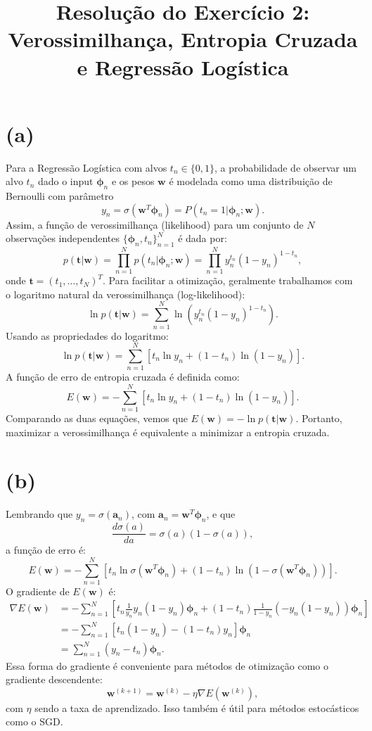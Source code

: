 \documentclass[12pt]{article}
\title{Resolução do Exercício 2: Verossimilhança, Entropia Cruzada e Regressão Logística}
\author{}
\date{}
\begin{document}
\maketitle

\section*{(a)}
Para a Regressão Logística com alvos $t_n \in \{0,1\}$, a probabilidade de observar um alvo $t_n$ dado o input $\boldsymbol{\phi}_n$ e os pesos $\mathbf{w}$ é modelada como uma distribuição de Bernoulli com parâmetro 
\[
y_n = \sigma(\mathbf{w}^T \boldsymbol{\phi}_n) = P(t_n = 1 | \boldsymbol{\phi}_n; \mathbf{w}).
\]
Assim, a função de verossimilhança (likelihood) para um conjunto de $N$ observações independentes $\{\boldsymbol{\phi}_n, t_n\}_{n=1}^{N}$ é dada por:
\[
p(\mathbf{t} | \mathbf{w}) = \prod_{n=1}^{N} p(t_n | \boldsymbol{\phi}_n; \mathbf{w}) = \prod_{n=1}^{N} y_n^{t_n} (1 - y_n)^{1 - t_n},
\]
onde $\mathbf{t} = (t_1, \ldots, t_N)^T$. Para facilitar a otimização, geralmente trabalhamos com o logaritmo natural da verossimilhança (log-likelihood):
\[
\ln p(\mathbf{t} | \mathbf{w}) = \sum_{n=1}^{N} \ln \left( y_n^{t_n} (1 - y_n)^{1 - t_n} \right).
\]
Usando as propriedades do logaritmo:
\[
\ln p(\mathbf{t} | \mathbf{w}) = \sum_{n=1}^{N} \left[ t_n \ln y_n + (1 - t_n) \ln(1 - y_n) \right].
\]
A função de erro de entropia cruzada é definida como:
\[
E(\mathbf{w}) = -\sum_{n=1}^{N} \left[ t_n \ln y_n + (1 - t_n) \ln(1 - y_n) \right].
\]
Comparando as duas equações, vemos que $E(\mathbf{w}) = -\ln p(\mathbf{t} | \mathbf{w})$. Portanto, maximizar a verossimilhança é equivalente a minimizar a entropia cruzada.

\section*{(b)}
Lembrando que $y_n = \sigma(\mathbf{a}_n)$, com $\mathbf{a}_n = \mathbf{w}^T \boldsymbol{\phi}_n$, e que
\[
\frac{d\sigma(a)}{da} = \sigma(a)(1 - \sigma(a)),
\]
a função de erro é:
\[
E(\mathbf{w}) = -\sum_{n=1}^{N} \left[ t_n \ln \sigma(\mathbf{w}^T \boldsymbol{\phi}_n) + (1 - t_n) \ln(1 - \sigma(\mathbf{w}^T \boldsymbol{\phi}_n)) \right].
\]
O gradiente de $E(\mathbf{w})$ é:
\begin{align*}
\nabla E(\mathbf{w}) &= -\sum_{n=1}^{N} \left[ t_n \frac{1}{y_n} y_n (1 - y_n) \boldsymbol{\phi}_n + (1 - t_n) \frac{1}{1 - y_n} (-y_n (1 - y_n)) \boldsymbol{\phi}_n \right] \\
&= -\sum_{n=1}^{N} \left[ t_n (1 - y_n) - (1 - t_n) y_n \right] \boldsymbol{\phi}_n \\
&= \sum_{n=1}^{N} (y_n - t_n) \boldsymbol{\phi}_n.
\end{align*}
Essa forma do gradiente é conveniente para métodos de otimização como o gradiente descendente:
\[
\mathbf{w}^{(k+1)} = \mathbf{w}^{(k)} - \eta \nabla E(\mathbf{w}^{(k)}),
\]
com $\eta$ sendo a taxa de aprendizado. Isso também é útil para métodos estocásticos como o SGD.
\end{document}
